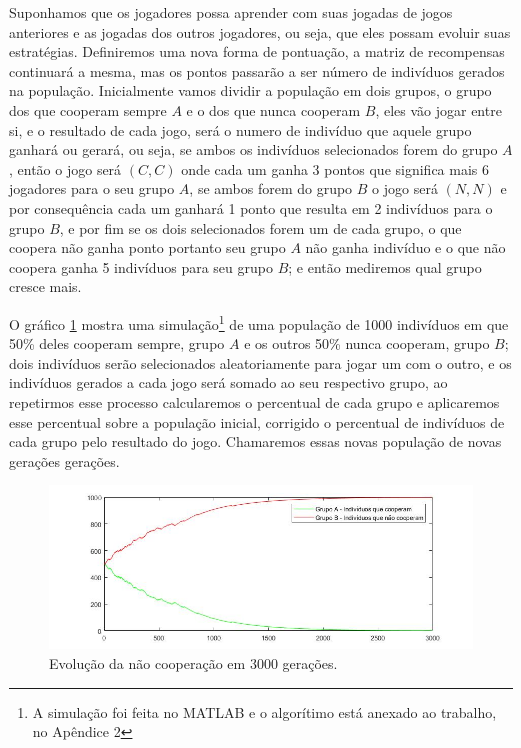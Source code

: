 Suponhamos que os jogadores possa aprender com suas jogadas de jogos anteriores e as jogadas dos outros jogadores, ou seja, que eles possam evoluir suas estratégias. Definiremos uma nova forma de pontuação, a matriz de recompensas continuará a mesma, mas os pontos passarão a ser número de indivíduos gerados na população. Inicialmente vamos dividir a população em dois grupos, o grupo dos que cooperam sempre $A$ e o dos que nunca cooperam $B$, eles vão jogar entre si, e o resultado de cada jogo, será o numero de indivíduo que aquele grupo ganhará ou gerará, ou seja, se ambos os indivíduos selecionados forem do grupo $A$, então o jogo será $(C,C)$ onde cada um ganha 3 pontos que significa mais 6 jogadores para o seu grupo $A$, se ambos forem do grupo $B$ o jogo será $(N,N)$ e por consequência cada um ganhará 1 ponto que resulta em 2 indivíduos para o grupo $B$, e por fim se os dois selecionados forem um de cada grupo, o que coopera não ganha ponto portanto seu grupo $A$ não ganha indivíduo e o que não coopera ganha 5 indivíduos para seu grupo $B$; e então mediremos qual grupo cresce mais.

O gráfico \ref{fig9} mostra uma simulação\footnote{A simulação foi feita no MATLAB e o algorítimo está anexado ao trabalho, no Apêndice 2} de uma população de 1000 indivíduos em que 50\% deles cooperam sempre, grupo $A$ e os outros 50\% nunca cooperam, grupo $B$; dois indivíduos serão selecionados aleatoriamente para jogar um com o outro, e os indivíduos gerados a cada jogo será somado ao seu respectivo grupo, ao repetirmos esse processo calcularemos o percentual de cada grupo e aplicaremos esse percentual sobre a população inicial, corrigido o percentual de indivíduos de cada grupo pelo resultado do jogo. Chamaremos essas novas população de novas gerações gerações.

\begin{figure}[H]
\centering
\includegraphics[width=14cm]{graf9.jpg}
\caption{Evolução da não cooperação em 3000 gerações.}
\label{fig9}
\end{figure}

